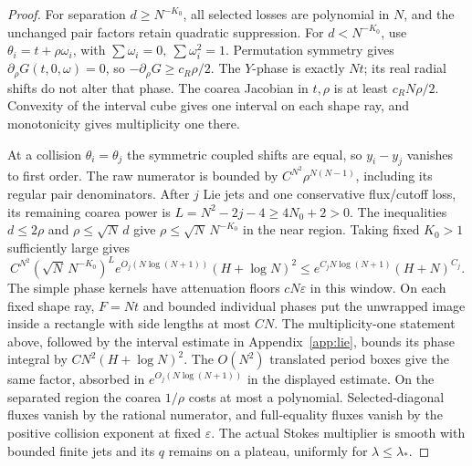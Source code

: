 \documentclass[11pt]{article}
\numberwithin{equation}{section}
\theoremstyle{definition}
\newcommand{\eps}{\varepsilon}
\begin{document}
\begin{proof}
For separation \(d\ge N^{-K_0}\), all selected losses are polynomial
in \(N\), and the unchanged pair factors retain quadratic suppression.
For \(d<N^{-K_0}\), use \(\theta_i=t+\rho\omega_i\), with
\(\sum\omega_i=0,\ \sum\omega_i^2=1\).
Permutation symmetry gives \(\partial_\rho G(t,0,\omega)=0\),
so \(-\partial_\rho G\ge c_R\rho/2\).
The \(Y\)-phase is exactly \(Nt\); its real radial shifts do not
alter that phase. The coarea Jacobian in \(t,\rho\) is at least
\(c_RN\rho/2\). Convexity of the interval cube gives one interval
on each shape ray, and monotonicity gives multiplicity one there.

At a collision \(\theta_i=\theta_j\) the symmetric coupled shifts
are equal, so \(y_i-y_j\) vanishes to first order. The raw numerator
is bounded by \(C^{N^2}\rho^{N(N-1)}\), including its regular pair
denominators. After \(j\) Lie jets and one conservative flux/cutoff
loss, its remaining coarea power is
\(L=N^2-2j-4\ge4N_0+2>0\).
The inequalities \(d\le2\rho\) and \(\rho\le\sqrt N\,d\) give
\(\rho\le\sqrt N\,N^{-K_0}\) in the near region.
Taking fixed \(K_0>1\) sufficiently large gives
\[
 C^{N^2}(\sqrt N\,N^{-K_0})^L
      e^{O_j(N\log(N+1))}(H+\log N)^2
 \le e^{C_jN\log(N+1)}(H+N)^{C_j}.
\]
The simple phase kernels have attenuation floors \(cN\eps\) in
this window. On each fixed shape ray, \(F=Nt\) and bounded individual
phases put the unwrapped image inside a rectangle with side lengths
at most \(CN\). The multiplicity-one statement above, followed by
the interval estimate in Appendix~\ref{app:lie}, bounds its phase
integral by \(CN^2(H+\log N)^2\). The \(O(N^2)\) translated
period boxes give the same factor, absorbed in
\(e^{O_j(N\log(N+1))}\) in the displayed estimate.
On the separated region the coarea \(1/\rho\) costs at most a
polynomial.
Selected-diagonal fluxes vanish by the rational numerator, and
full-equality fluxes vanish by the positive collision exponent at
fixed \(\eps\). The actual Stokes multiplier is smooth with bounded
finite jets and its \(q\) remains on a plateau, uniformly for
\(\lambda\le\lambda_*\).
\end{proof}
\end{document}
